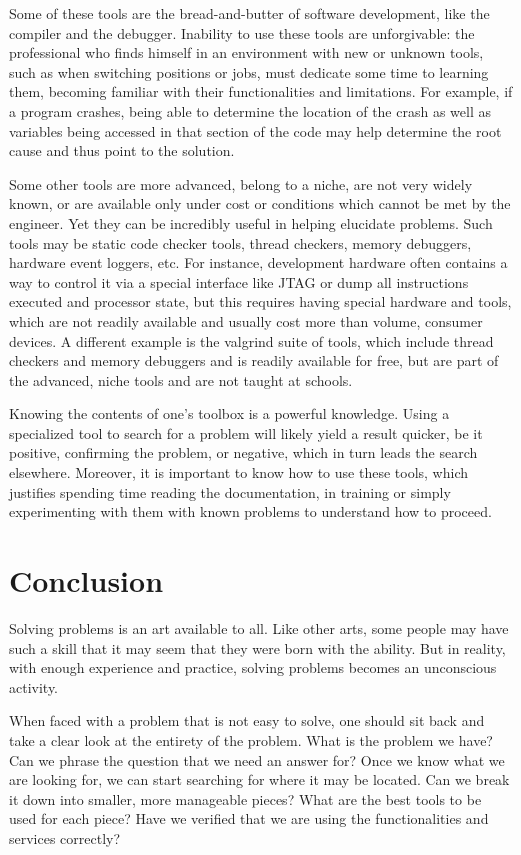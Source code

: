 Some of these tools are the bread-and-butter of software development, like the compiler and the debugger. Inability to use these tools are unforgivable: the professional who finds himself in an environment with new or unknown tools, such as when switching positions or jobs, must dedicate some time to learning them, becoming familiar with their functionalities and limitations. For example, if a program crashes, being able to determine the location of the crash as well as variables being accessed in that section of the code may help determine the root cause and thus point to the solution.

Some other tools are more advanced, belong to a niche, are not very widely known, or are available only under cost or conditions which cannot be met by the engineer. Yet they can be incredibly useful in helping elucidate problems. Such tools may be static code checker tools, thread checkers, memory debuggers, hardware event loggers, etc. For instance, development hardware often contains a way to control it via a special interface like JTAG or dump all instructions executed and processor state, but this requires having special hardware and tools, which are not readily available and usually cost more than volume, consumer devices. A different example is the valgrind suite of tools, which include thread checkers and memory debuggers and is readily available for free, but are part of the advanced, niche tools and are not taught at schools.

Knowing the contents of one’s toolbox is a powerful knowledge. Using a specialized tool to search for a problem will likely yield a result quicker, be it positive, confirming the problem, or negative, which in turn leads the search elsewhere. Moreover, it is important to know how to use these tools, which justifies spending time reading the documentation, in training or simply experimenting with them with known problems to understand how to proceed.

\section*{Conclusion}

Solving problems is an art available to all. Like other arts, some people may have such a skill that it may seem that they were born with the ability. But in reality, with enough experience and practice, solving problems becomes an unconscious activity.

When faced with a problem that is not easy to solve, one should sit back and take a clear look at the entirety of the problem. What is the problem we have? Can we phrase the question that we need an answer for? Once we know what we are looking for, we can start searching for where it may be located. Can we break it down into smaller, more manageable pieces? What are the best tools to be used for each piece? Have we verified that we are using the functionalities and services correctly?

